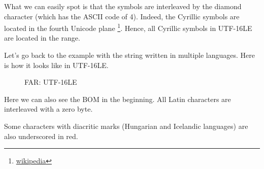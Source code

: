 What we can easily spot is that the symbols are interleaved by the diamond character (which has the ASCII code of 4).
Indeed, the Cyrillic symbols are located in the fourth Unicode plane
\footnote{\href{http://go.yurichev.com/17003}{wikipedia}}.
Hence, all Cyrillic symbols in UTF-16LE are located in the  range.

Let's go back to the example with the string written in multiple languages.
Here is how it looks like in UTF-16LE.

\begin{figure}[H]
\centering
{}
\caption{FAR: UTF-16LE}
\end{figure}

Here we can also see the \ac{BOM} in the beginning.
All Latin characters are interleaved with a zero byte.

Some characters with diacritic marks (Hungarian and Icelandic languages) are also underscored in red.




